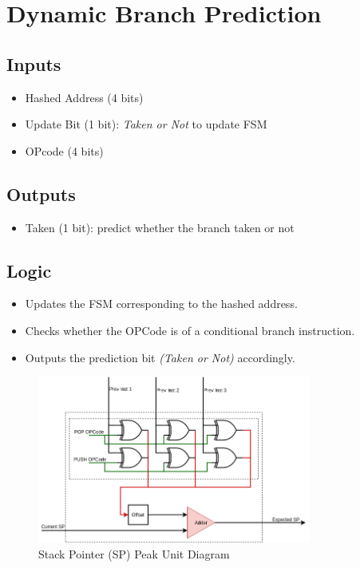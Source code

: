 \documentclass[12pt]{report}
\begin{document}
\section{Dynamic Branch Prediction}

\subsection{Inputs}
\begin{itemize}
    \item Hashed Address (4 bits)
    \item Update Bit (1 bit): \emph{Taken or Not}  to update FSM
    \item OPcode (4 bits)
\end{itemize}

\subsection{Outputs}
\begin{itemize}
    \item Taken (1 bit): predict whether the branch taken or not
\end{itemize}

\subsection{Logic}
\begin{itemize}
    \item Updates the FSM corresponding to the hashed address.
    \item Checks whether the OPCode is of a conditional branch instruction.
    \item Outputs the prediction bit \emph{(Taken or Not)} accordingly.
\end{itemize}

\begin{center}
    \begin{figure}[hp]
        \centering
        \includegraphics[width=0.8\textwidth]{pspu}
        \caption{Stack Pointer (SP) Peak Unit Diagram}
        \label{fig:pspu}
    \end{figure}
\end{center}
\end{document}
